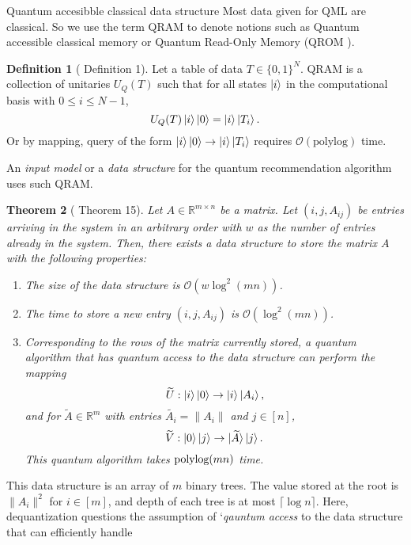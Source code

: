 \documentclass[10pt,twoside,reqno]{amsart} %
\makeatletter
\renewcommand{\section}{\@startsection{section}{1}
   \z@{.7\linespacing\@plus\linespacing}{.5\linespacing}
   {\normalfont\upshape\bfseries\centering}}
\theoremstyle{plain}
\newtheorem{thm}{Theorem}[section]
\theoremstyle{definition}
\newtheorem{defn}[thm]{Definition}
\makeatother
\begin{document}
\section{Quantum accesibble classical data structure}
Most data given for QML are classical. So we use the term QRAM to denote notions such as
Quantum accessible classical memory or Quantum Read-Only Memory (QROM \cite{babbush2018}). 

\begin{defn}[\cite{jaques2023} Definition 1]
  Let a table of data $T\in\{0,1\}^N$. QRAM is a collection of unitaries $U_Q(T)$
  such that for all states $\ket{i}$ in the computational basis
  with $0\leq i\leq N-1$, 
  \[
    U_Q(T)\ket{i}\ket{0} = \ket{i}\ket{T_i}.
  \]
  Or by mapping, query of the form $\ket{i}\ket{0}\rightarrow\ket{i}\ket{T_i}$ requires
  $\mathcal{O}(\textrm{polylog})$ time.
\end{defn}
An \emph{input model} or a \emph{data structure} for the quantum recommendation algorithm
uses such QRAM.
\begin{thm}[\cite{kerenidis2017} Theorem 15]
  Let $A\in\mathbb{R}^{m\times n}$ be a matrix. Let $(i,j,A_{ij})$ be 
  entries arriving in the system in an arbitrary order with $w$ as the
  number of entries already in the system. Then, there exists a data structure
  to store the matrix $A$ with the following properties:
  \begin{enumerate}
    \item The size of the data structure is $\mathcal{O}(w\log^2(mn))$.
    \item The time to store a new entry $(i,j,A_{ij})$ is 
      $\mathcal{O}(\log^2(mn))$.
    \item Corresponding to the rows of the matrix currently stored,
      a quantum algorithm that has quantum access to the data structure
      can perform the mapping 
      \[
        \widetilde{U}:\ket{i}\ket{0}\rightarrow\ket{i}\ket{A_i},
      \]
      and for $\widetilde{A}\in\mathbb{R}^m$ with entries 
      $\widetilde{A_i}=\|A_i\|$ and $j\in[n]$,
      \[
        \widetilde{V}:\ket{0}\ket{j}\rightarrow\ket{\widetilde{A}}\ket{j}.
      \]
      This quantum algorithm takes $\textrm{\normalfont polylog}(mn)$ time.
  \end{enumerate}
\end{thm}
This data structure is an array of $m$  binary trees. The value
stored at the root is $\|A_i\|^2$ for $i\in[m]$, and depth of each tree is
at most $\lceil\log n\rceil$. Here, dequantization questions the assumption
of `\emph{qauntum access} to the data structure that can efficiently handle
\end{document}
